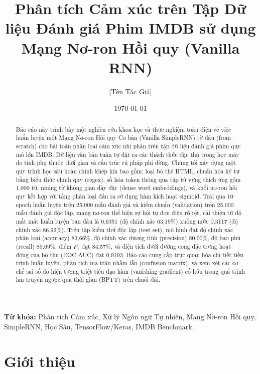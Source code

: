 \documentclass[11pt,a4paper]{article}
\title{\textbf{Phân tích Cảm xúc trên Tập Dữ liệu Đánh giá Phim IMDB sử dụng Mạng Nơ-ron Hồi quy (Vanilla RNN)}}
\author{[Tên Tác Giả]}
\date{\today}
\begin{document}
\maketitle

\begin{abstract}
Báo cáo này trình bày một nghiên cứu khoa học và thực nghiệm toàn diện về việc huấn luyện một Mạng Nơ-ron Hồi quy Cơ bản (Vanilla SimpleRNN) từ đầu (from scratch) cho bài toán phân loại cảm xúc nhị phân trên tập dữ liệu đánh giá phim quy mô lớn IMDB. Dữ liệu văn bản tuần tự đặt ra các thách thức đặc thù trong học máy do tính phụ thuộc thời gian và cấu trúc cú pháp phi dừng. Chúng tôi xây dựng một quy trình học sâu hoàn chỉnh khép kín bao gồm: loại bỏ thẻ HTML, chuẩn hóa ký tự bằng biểu thức chính quy (regex), số hóa token thông qua tập từ vựng thích ứng gồm 1.000 từ, nhúng từ không gian dày đặc (dense word embeddings), và khối nơ-ron hồi quy kết hợp với tầng phân loại đầu ra sử dụng hàm kích hoạt sigmoid. Trải qua 10 epoch huấn luyện trên 25.000 mẫu đánh giá và kiểm chuẩn (validation) trên 25.000 mẫu đánh giá độc lập, mạng nơ-ron thể hiện sự hội tụ đơn điệu rõ rệt, cải thiện từ độ mất mát huấn luyện ban đầu là 0,6351 (độ chính xác 63,19\%) xuống mức 0,3117 (độ chính xác 86,92\%). Trên tập kiểm thử độc lập (test set), mô hình đạt độ chính xác phân loại (accuracy) 83,66\%, độ chính xác dương tính (precision) 80,00\%, độ bao phủ (recall) 89,69\%, điểm $F_1$ đạt 84,57\%, và diện tích dưới đường cong đặc trưng hoạt động của bộ thu (ROC-AUC) đạt 0,9193. Báo cáo cung cấp trực quan hóa chi tiết tiến trình huấn luyện, phân tích ma trận nhầm lẫn (confusion matrix), và xem xét các cơ chế sai số do hiện tượng triệt tiêu đạo hàm (vanishing gradient) cố hữu trong quá trình lan truyền ngược qua thời gian (BPTT) trên chuỗi dài.
\end{abstract}

\vspace{0.5em}
\noindent\textbf{Từ khóa:} Phân tích Cảm xúc, Xử lý Ngôn ngữ Tự nhiên, Mạng Nơ-ron Hồi quy, SimpleRNN, Học Sâu, TensorFlow/Keras, IMDB Benchmark.

\newpage
\tableofcontents
\newpage

\section{Giới thiệu}
\end{document}

